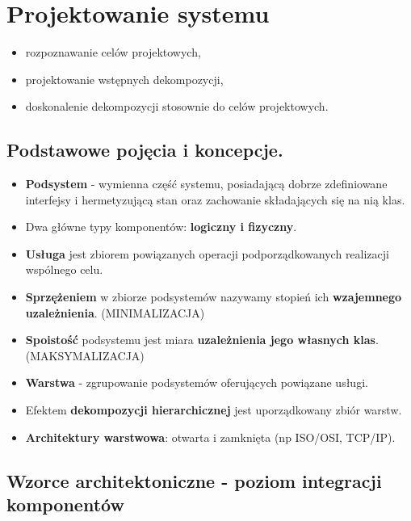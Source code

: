 \documentclass[a4paper]{article}
\begin{document}
    \section{Projektowanie systemu}
    \begin{itemize}
        \item rozpoznawanie celów projektowych,
        \item projektowanie wstępnych dekompozycji,
        \item doskonalenie dekompozycji stosownie do celów projektowych.
    \end{itemize}

    \subsection{Podstawowe pojęcia i koncepcje.}
    \begin{itemize}
        \item \textbf{Podsystem} - wymienna część systemu, posiadającą dobrze zdefiniowane interfejsy i
        hermetyzującą stan oraz zachowanie składających się na nią klas.
        \item Dwa główne typy komponentów: \textbf{logiczny i fizyczny}.
        \item \textbf{Usługa} jest zbiorem powiązanych operacji podporządkowanych realizacji wspólnego
        celu.
        \item \textbf{Sprzężeniem} w zbiorze podsystemów nazywamy stopień ich \textbf{wzajemnego uzależnienia}. (MINIMALIZACJA)
        \item \textbf{Spoistość} podsystemu jest miara \textbf{uzależnienia jego własnych klas}. (MAKSYMALIZACJA)
        \item \textbf{Warstwa} - zgrupowanie podsystemów oferujących powiązane usługi.
        \item Efektem \textbf{dekompozycji hierarchicznej} jest uporządkowany zbiór warstw.
        \item \textbf{Architektury warstwowa}: otwarta i zamknięta (np ISO/OSI, TCP/IP).
    \end{itemize}

    \subsection{Wzorce architektoniczne - poziom integracji komponentów}
\end{document}
